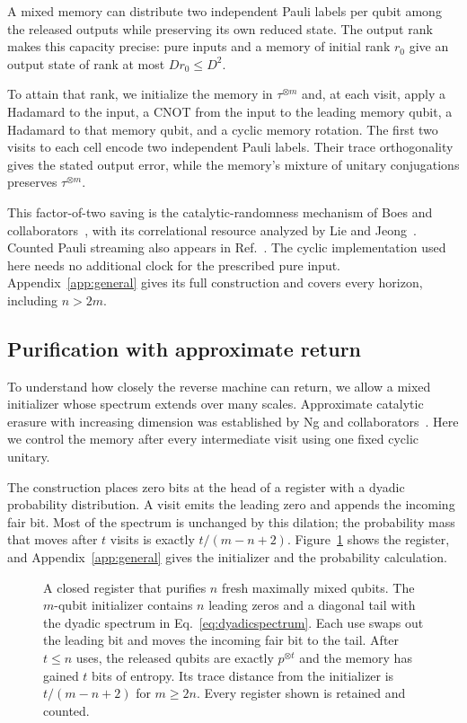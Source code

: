 \documentclass[aps,pra,reprint,superscriptaddress,longbibliography,nofootinbib,floatfix]{revtex4-2}
\begin{document}

A mixed memory can distribute two independent Pauli labels per qubit among the released outputs while preserving its own reduced state. The output rank makes this capacity precise: pure inputs and a memory of initial rank $r_0$ give an output state of rank at most $Dr_0\le D^2$.

To attain that rank, we initialize the memory in $\tau^{\otimes m}$ and, at each visit, apply a Hadamard to the input, a CNOT from the input to the leading memory qubit, a Hadamard to that memory qubit, and a cyclic memory rotation. The first two visits to each cell encode two independent Pauli labels. Their trace orthogonality gives the stated output error, while the memory's mixture of unitary conjugations preserves $\tau^{\otimes m}$.

This factor-of-two saving is the catalytic-randomness mechanism of Boes and collaborators~\cite{boes}, with its correlational resource analyzed by Lie and Jeong~\cite{lie}. Counted Pauli streaming also appears in Ref.~\cite{douglas}. The cyclic implementation used here needs no additional clock for the prescribed pure input. Appendix~\ref{app:general} gives its full construction and covers every horizon, including $n>2m$.

\subsection{Purification with approximate return}

To understand how closely the reverse machine can return, we allow a mixed initializer whose spectrum extends over many scales. Approximate catalytic erasure with increasing dimension was established by Ng and collaborators~\cite{ng}. Here we control the memory after every intermediate visit using one fixed cyclic unitary.


The construction places zero bits at the head of a register with a dyadic probability distribution. A visit emits the leading zero and appends the incoming fair bit. Most of the spectrum is unchanged by this dilation; the probability mass that moves after $t$ visits is exactly $t/(m-n+2)$. Figure~\ref{fig:shift} shows the register, and Appendix~\ref{app:general} gives the initializer and the probability calculation.

\begin{figure}[!t]
\centering

\caption{A closed register that purifies $n$ fresh maximally mixed qubits. The $m$-qubit initializer contains $n$ leading zeros and a diagonal tail with the dyadic spectrum in Eq.~\eqref{eq:dyadicspectrum}. Each use swaps out the leading bit and moves the incoming fair bit to the tail. After $t\le n$ uses, the released qubits are exactly $p^{\otimes t}$ and the memory has gained $t$ bits of entropy. Its trace distance from the initializer is $t/(m-n+2)$ for $m\ge2n$. Every register shown is retained and counted.}
\label{fig:shift}
\end{figure}
\end{document}
